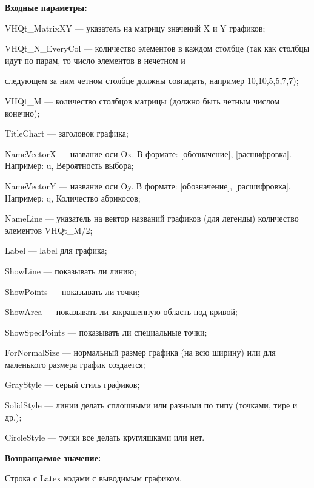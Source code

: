 \textbf{Входные параметры:}
 
VHQt\_MatrixXY --- указатель на матрицу значений X и Y графиков;
 
VHQt\_N\_EveryCol --- количество элементов в каждом столбце (так как столбцы идут по парам, то число элементов в нечетном и
 
следующем за ним четном столбце должны совпадать, например 10,10,5,5,7,7);
 
VHQt\_M --- количество столбцов матрицы (должно быть четным числом конечно);
 
TitleChart --- заголовок графика;
 
NameVectorX --- название оси Ox. В формате: [обозначение], [расшифровка]. Например: u, Вероятность выбора;
 
NameVectorY --- название оси Oy. В формате: [обозначение], [расшифровка]. Например: q, Количество абрикосов;
 
NameLine --- указатель на вектор названий графиков (для легенды) количество элементов VHQt\_M/2;
 
Label --- label для графика;
 
ShowLine --- показывать ли линию;
 
ShowPoints --- показывать ли точки;
 
ShowArea --- показывать ли закрашенную область под кривой;
 
ShowSpecPoints --- показывать ли специальные точки;
 
ForNormalSize --- нормальный размер графика (на всю ширину) или для маленького размера график создается;
 
GrayStyle --- серый стиль графиков;
 
SolidStyle --- линии делать сплошными или разными по типу (точками, тире и др.);
 
CircleStyle --- точки все делать кругляшками или нет.
	
\textbf{Возвращаемое значение:}

Строка с Latex кодами с выводимым графиком.